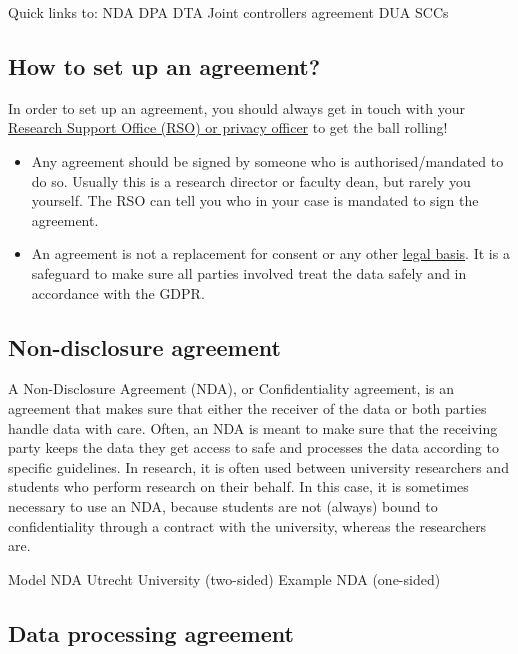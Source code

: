 \documentclass[
]{book}
\providecommand{\tightlist}{%
  \setlength{\itemsep}{0pt}\setlength{\parskip}{0pt}}
\begin{document}
Quick links to:
NDA
DPA
DTA
Joint controllers agreement
DUA
SCCs

\hypertarget{set-up-agreements}{%
\subsection{How to set up an agreement?}\label{set-up-agreements}}

In order to set up an agreement, you should always get in touch with your
\protect\hyperlink{support}{Research Support Office (RSO) or privacy officer} to get the ball rolling!

\begin{itemize}
\tightlist
\item
  Any agreement should be signed by someone who is authorised/mandated to do so.
  Usually this is a research director or faculty dean, but rarely you yourself.
  The RSO can tell you who in your case is mandated to sign the agreement.
\item
  An agreement is not a replacement for consent or any other
  \protect\hyperlink{legal-basis}{legal basis}. It is a safeguard to make sure all
  parties involved treat the data safely and in accordance with the GDPR.
\end{itemize}

\hypertarget{nda}{%
\subsection{Non-disclosure agreement}\label{nda}}

A Non-Disclosure Agreement (NDA), or Confidentiality agreement, is an agreement
that makes sure that either the receiver of the data or both parties handle
data with care. Often, an NDA is meant to make sure that the receiving party
keeps the data they get access to safe and processes the data according to
specific guidelines. In research, it is often used between university researchers
and students who perform research on their behalf. In this case, it is sometimes
necessary to use an NDA, because students are not (always) bound to
confidentiality through a contract with the university, whereas the researchers
are.

Model NDA Utrecht University (two-sided)
Example NDA (one-sided)

\hypertarget{data-processing-agreement}{%
\subsection{Data processing agreement}\label{data-processing-agreement}}
\end{document}
